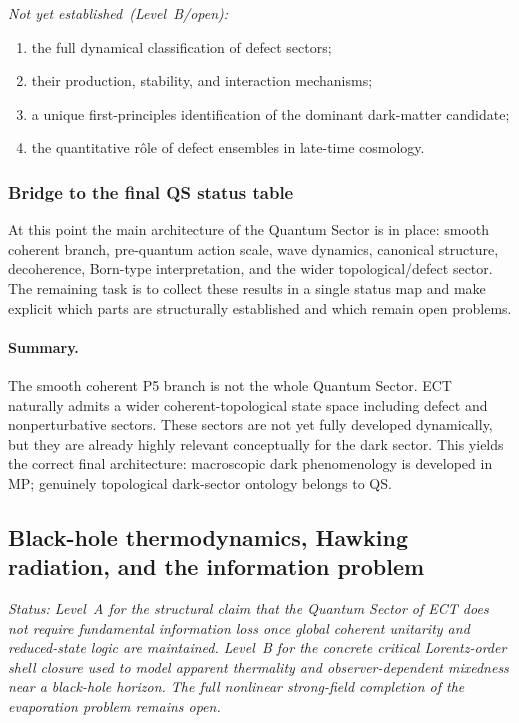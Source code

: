 \textit{Not yet established~(Level~B/open):}
\begin{enumerate}[label=(\roman*)]
  \item the full dynamical classification of defect sectors;
  \item their production, stability, and interaction mechanisms;
  \item a unique first-principles identification of the dominant
    dark-matter candidate;
  \item the quantitative r\^ole of defect ensembles in late-time
    cosmology.
\end{enumerate}

\subsubsection*{Bridge to the final QS status table}

At this point the main architecture of the Quantum Sector is in place:
smooth coherent branch, pre-quantum action scale, wave dynamics,
canonical structure, decoherence, Born-type interpretation, and the
wider topological/defect sector.
The remaining task is to collect these results in a single status map
and make explicit which parts are structurally established and which
remain open problems.

\paragraph{Summary.}
The smooth coherent P5 branch is not the whole Quantum Sector.
ECT naturally admits a wider coherent-topological state space
including defect and nonperturbative sectors.
These sectors are not yet fully developed dynamically, but they are
already highly relevant conceptually for the dark sector.
This yields the correct final architecture: macroscopic dark
phenomenology is developed in MP; genuinely topological dark-sector
ontology belongs to QS.

\subsection{Black-hole thermodynamics, Hawking radiation,
and the information problem}
\label{sec:qs_black_holes}

\textit{Status: Level~A for the structural claim that the Quantum
Sector of ECT does not require fundamental information loss once global
coherent unitarity and reduced-state logic are maintained.
Level~B for the concrete critical Lorentz-order shell closure used to
model apparent thermality and observer-dependent mixedness near a
black-hole horizon.
The full nonlinear strong-field completion of the evaporation problem
remains open.}


